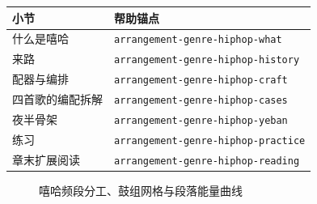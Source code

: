 \begin{helpmapping}
\begin{longtable}{p{}p{}}
\toprule
小节 & 帮助锚点 \\
\midrule
什么是嘻哈 & \texttt{arrangement-genre-hiphop-what} \\
来路 & \texttt{arrangement-genre-hiphop-history} \\
配器与编排 & \texttt{arrangement-genre-hiphop-craft} \\
四首歌的编配拆解 & \texttt{arrangement-genre-hiphop-cases} \\
夜半骨架 & \texttt{arrangement-genre-hiphop-yeban} \\
练习 & \texttt{arrangement-genre-hiphop-practice} \\
章末扩展阅读 & \texttt{arrangement-genre-hiphop-reading} \\
\bottomrule
\end{longtable}
\end{helpmapping}

\begin{figure}[htbp]\centering
{}
\caption{嘻哈频段分工、鼓组网格与段落能量曲线}
\end{figure}
